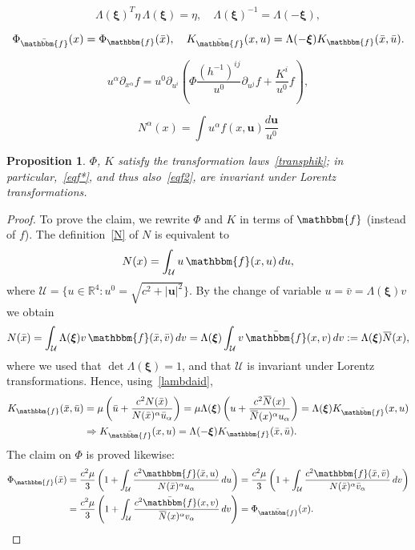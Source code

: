 \documentclass[10pt,a4paper]{amsart}
\newtheorem{proposition}{Proposition}
\newcommand{\R}{\mathbb{R}}
\newcommand{\overbar}[1]{\mkern 1.5mu\overline{\mkern-1.5mu#1\mkern-1.5mu}\mkern 1.5mu}
\begin{document}
\begin{equation}\label{lambdaid}
\Lambda({\bm\xi})^T\eta\, \Lambda({\bm \xi})=\eta,
\quad \Lambda({\bm \xi})^{-1}=\Lambda(-{\bm \xi}),
\end{equation}

\begin{equation}\label{transphik}
\Phi_{\bar{\mathbbm{f}}}(x)=\Phi_\mathbbm{f} (\bar{x}),\quad {K}_{\bar{\mathbbm{f}}}(x,u) =\Lambda(-{\bm \xi}) K_\mathbbm{f} (\bar{x},\bar{u}).
\end{equation}

\begin{equation}\label{eqf2}
u^\alpha\partial_{x^\alpha}f=u^0\partial_{u^i}\left(\Phi\frac{(h^{-1})^{ij}}{u^0}\partial_{u^j}f+\frac{K^i}{u^0}f\right),
\end{equation}

\begin{equation}\label{N}
N^\alpha(x) =\int u^\alpha f(x,{\bm u})\frac{d{\bm u}}{u^0}
\end{equation}

\begin{proposition}\label{inv4dprop}
$\Phi$, $K$ satisfy the transformation laws~\eqref{transphik}; in particular,~\eqref{eqf*}, and thus also~\eqref{eqf2}, are invariant under Lorentz transformations.
\end{proposition}

\begin{proof}
To prove the claim, we rewrite $\Phi$ and $K$ in terms of $\mathbbm{f}$ (instead of $f$). The definition~\eqref{N} of $N$ is equivalent to 
\[
N(x)=\int_\mathcal{U} u\,\mathbbm{f}(x, u)\,du,
\]
where $\mathcal{U}=\{u\in \R^4:u^0=\sqrt{c^2+|{\bm u}|^2}\}$. By the change of variable $u=\bar{v}=\Lambda({\bm\xi}) v$ we obtain
\[
N(\bar{x})=\int_\mathcal{U} \Lambda({\bm\xi}) v\,\mathbbm{f}(\bar{x}, \bar{v})\,dv=\Lambda({\bm\xi})\int_\mathcal{U} v\,\bar{\mathbbm{f}}(x,v)\,dv:=\Lambda({\bm\xi}) \overbar{N}(x),
\] 
where we used that $\det\Lambda({\bm\xi})=1$, and that $\mathcal{U}$ is invariant under Lorentz transformations.
Hence, using~\eqref{lambdaid},
\begin{align*}
K_\mathbbm{f} (\bar{x},\bar{u})&=\mu \left(\bar{u}+\frac{c^2N(\bar{x})}{N(\bar{x})^\alpha \bar{u}_\alpha}\right)=\mu\Lambda({\bm\xi})\left(u+\frac{c^2\overbar{N}(x)}{\overbar{N}(x)^\alpha u_\alpha}\right)=\Lambda({\bm\xi})K_{\bar{\mathbbm{f}}}(x,u)\\
&\Rightarrow K_{\bar{\mathbbm{f}}}(x,u)=\Lambda(-{\bm \xi})K_\mathbbm{f} (\bar{x},\bar{u}).
\end{align*}
The claim on $\Phi$ is proved likewise:
\begin{align*}
\Phi_\mathbbm{f} (\bar{x})&=\frac{c^2\mu}{3}\left(1+\int_\mathcal{U} \frac{c^2\mathbbm{f}(\bar{x},u)}{N(\bar{x})^\alpha u_\alpha}\,du\right)=\frac{c^2\mu}{3}\left(1+\int_\mathcal{U} \frac{c^2\mathbbm{f}(\bar{x},\bar{v})}{N(\bar{x})^\alpha \bar{v}_\alpha}\,d v\right)\\
&=\frac{c^2\mu}{3}\left(1+\int_\mathcal{U} \frac{c^2\bar{\mathbbm{f}}(x,v)}{\overbar{N}(x)^\alpha v_\alpha}\,dv\right)=\Phi_{\bar{\mathbbm{f}}}(x).
\end{align*}
\end{proof}
\end{document}

